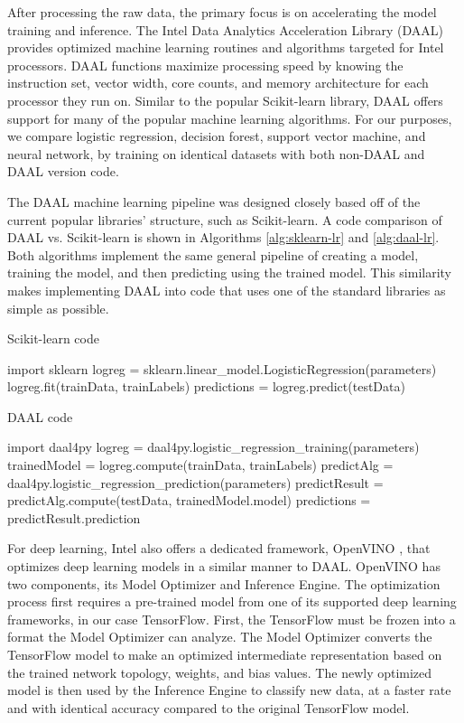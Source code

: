 After processing the raw data, the primary focus is on accelerating the model training and inference. The Intel Data Analytics Acceleration Library (DAAL)  \cite{daal} provides optimized machine learning routines and algorithms targeted for Intel processors. DAAL functions maximize processing speed by knowing the instruction set, vector width, core counts, and memory architecture for each processor they run on. Similar to the popular Scikit-learn library, DAAL offers support for many of the popular machine learning algorithms. For our purposes, we compare logistic regression, decision forest, support vector machine, and neural network, by training on identical datasets with both non-DAAL and DAAL version code.

The DAAL machine learning pipeline was designed closely based off of the current popular libraries' structure, such as Scikit-learn. A code comparison of DAAL vs. Scikit-learn is shown in Algorithms \ref{alg:sklearn-lr} and \ref{alg:daal-lr}. Both algorithms implement the same general pipeline of creating a model, training the model, and then predicting using the trained model. This similarity makes implementing DAAL into code that uses one of the standard libraries as simple as possible. 

\begin{algorithm}[h!]
	\caption{Scikit-learn code}
	\scriptsize
	\begin{algorithmic}[1]
		\State import sklearn
		\State logreg = sklearn.linear\_model.LogisticRegression(parameters)
		\State logreg.fit(trainData, trainLabels)
		\State predictions = logreg.predict(testData)
	\end{algorithmic}
	\label{alg:sklearn-lr}
\end{algorithm}

\begin{algorithm}[h!]
	\caption{DAAL code}
	\scriptsize
	\begin{algorithmic}[1]
		\State import daal4py
		\State logreg = daal4py.logistic\_regression\_training(parameters)
		\State trainedModel = logreg.compute(trainData, trainLabels)
		\State predictAlg = daal4py.logistic\_regression\_prediction(parameters)
		\State predictResult = predictAlg.compute(testData, trainedModel.model)
		\State predictions = predictResult.prediction
	\end{algorithmic}
	\label{alg:daal-lr}
\end{algorithm}

For deep learning, Intel also offers a dedicated framework, OpenVINO  \cite{openvino}, that optimizes deep learning models in a similar manner to DAAL. OpenVINO has two components, its Model Optimizer and Inference Engine. The optimization process first requires a pre-trained model from one of its supported deep learning frameworks, in our case TensorFlow. First, the TensorFlow must be frozen into a format the Model Optimizer can analyze. The Model Optimizer converts the TensorFlow model to make an optimized intermediate representation based on the trained network topology, weights, and bias values. The newly optimized model is then used by the Inference Engine to classify new data, at a faster rate and with identical accuracy compared to the original TensorFlow model.

